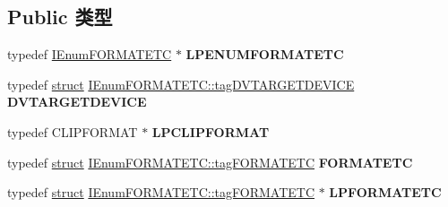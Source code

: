 \subsection*{Public 类型}
\begin{DoxyCompactItemize}
\item 
\mbox{\label{interface_i_enum_f_o_r_m_a_t_e_t_c_af0f2914e2a6db1e1b112f1d15fd1edf2}} 
typedef \hyperlink{interface_i_enum_f_o_r_m_a_t_e_t_c}{I\+Enum\+F\+O\+R\+M\+A\+T\+E\+TC} $\ast$ {\bfseries L\+P\+E\+N\+U\+M\+F\+O\+R\+M\+A\+T\+E\+TC}
\item 
\mbox{\label{interface_i_enum_f_o_r_m_a_t_e_t_c_ac7ee56778d82b2b9963403ecdfd064a6}} 
typedef \hyperlink{interfacestruct}{struct} \hyperlink{struct_i_enum_f_o_r_m_a_t_e_t_c_1_1tag_d_v_t_a_r_g_e_t_d_e_v_i_c_e}{I\+Enum\+F\+O\+R\+M\+A\+T\+E\+T\+C\+::tag\+D\+V\+T\+A\+R\+G\+E\+T\+D\+E\+V\+I\+CE} {\bfseries D\+V\+T\+A\+R\+G\+E\+T\+D\+E\+V\+I\+CE}
\item 
\mbox{\label{interface_i_enum_f_o_r_m_a_t_e_t_c_ac1f2140f8cd51645175cfe2cdca38f60}} 
typedef C\+L\+I\+P\+F\+O\+R\+M\+AT $\ast$ {\bfseries L\+P\+C\+L\+I\+P\+F\+O\+R\+M\+AT}
\item 
\mbox{\label{interface_i_enum_f_o_r_m_a_t_e_t_c_ae1a920de96bcd2fb8fddc4737f14df47}} 
typedef \hyperlink{interfacestruct}{struct} \hyperlink{struct_i_enum_f_o_r_m_a_t_e_t_c_1_1tag_f_o_r_m_a_t_e_t_c}{I\+Enum\+F\+O\+R\+M\+A\+T\+E\+T\+C\+::tag\+F\+O\+R\+M\+A\+T\+E\+TC} {\bfseries F\+O\+R\+M\+A\+T\+E\+TC}
\item 
\mbox{\label{interface_i_enum_f_o_r_m_a_t_e_t_c_a2832223fdecbbbdffb408215ff03ec50}} 
typedef \hyperlink{interfacestruct}{struct} \hyperlink{struct_i_enum_f_o_r_m_a_t_e_t_c_1_1tag_f_o_r_m_a_t_e_t_c}{I\+Enum\+F\+O\+R\+M\+A\+T\+E\+T\+C\+::tag\+F\+O\+R\+M\+A\+T\+E\+TC} $\ast$ {\bfseries L\+P\+F\+O\+R\+M\+A\+T\+E\+TC}
\end{DoxyCompactItemize}
